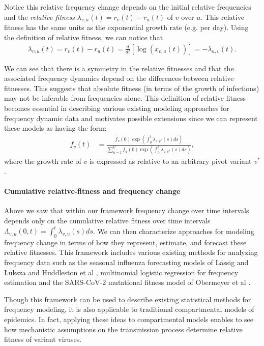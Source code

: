 \documentclass[11pt,oneside,letterpaper]{article}
\begin{document}
Notice this relative frequency change depends on the initial relative frequencies and the \emph{relative fitness} $\lambda_{v,u}(t) = r_{v}(t) - r_{u}(t)$ of $v$ over $u$.
This relative fitness has the same units as the exponential growth rate (e.g. per day).
Using the definition of relative fitness, we can notice that
\begin{align}
\lambda_{v, u}(t) = r_{v}(t) - r_{u}(t) = \frac{d }{d t} \left[\log \left( x_{v,u}(t) \right) \right] = - \lambda_{u,v}(t).
\end{align}

We can see that there is a symmetry in the relative fitnesses and that the associated frequency dynamics depend on the differences between relative fitnesses.
This suggests that absolute fitness (in terms of the growth of infections) may not be inferable from frequencies alone.
This definition of relative fitness becomes essential in describing various existing modeling approaches for frequency dynamic data and motivates possible extensions since we can represent these models as having the form:
\begin{align}
    f_{v}(t) &= \frac{ f_{v}(0) \exp( \int_{0}^{t} \lambda_{v, v^*}(s) ds)}{\sum_{u=1}^{V}  f_{u}(0) \exp( \int_{0}^{t} \lambda_{u, v^*}(s) ds)},
\end{align}
where the growth rate of $v$ is expressed as relative to an arbitrary pivot variant $v^*$.

\paragraph{Cumulative relative-fitness and frequency change}

Above we saw that within our framework frequency change over time intervals depends only on the cumulative relative fitness over time intervals $\Lambda_{v,u}(0, t) = \int_{0}^{t} \lambda_{v, u}(s)ds$.
We can then characterize approaches for modeling frequency change in terms of how they represent, estimate, and forecast these relative fitnesses.
This framework includes various existing methods for analyzing frequency data such as the seasonal influenza forecasting models of L{\"a}ssig and {\L}uksza \cite{luksza2014predictive} and Huddleston et al \cite{Huddleston2020}, multinomial logistic regression for frequency estimation \cite{Annavajhala2021} and the SARS-CoV-2 mutational fitness model of Obermeyer et al \cite{Obermeyer2022}.

Though this framework can be used to describe existing statistical methods for frequency modeling, it is also applicable to traditional compartmental models of epidemics.
In fact, applying these ideas to compartmental models enables to see how mechanistic assumptions on the transmission process determine relative fitness of variant viruses.
\end{document}
